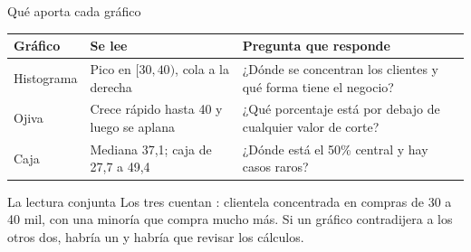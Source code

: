 \documentclass[aspectratio=169,10pt]{beamer}
\begin{document}
\begin{frame}{Qué aporta cada gráfico}
  \scriptsize
  \begin{center}
  \begin{tabular}{@{}p{2.4cm}p{4.4cm}p{5.2cm}@{}}
    \toprule
    \textbf{Gráfico} & \textbf{Se lee} & \textbf{Pregunta que responde} \\
    \midrule
    Histograma & Pico en $[30,40)$, cola a la derecha &
      ¿Dónde se concentran los clientes y qué forma tiene el negocio? \\
    \addlinespace
    Ojiva & Crece rápido hasta 40 y luego se aplana &
      ¿Qué porcentaje está por debajo de cualquier valor de corte? \\
    \addlinespace
    Caja & Mediana 37,1; caja de 27,7 a 49,4 &
      ¿Dónde está el 50\% central y hay casos raros? \\
    \bottomrule
  \end{tabular}
  \end{center}

  \vspace{0.1cm}
  \begin{alertblock}{La lectura conjunta}
    \scriptsize
    Los tres cuentan : clientela concentrada en
    compras de 30 a 40 mil, con una minoría que compra mucho más. Si un
    gráfico contradijera a los otros dos, habría un  y habría que revisar los cálculos.
  \end{alertblock}
\end{frame}
\end{document}
